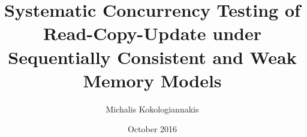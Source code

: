 \documentclass[diploma, english]{softlab-thesis}
\theoremstyle{definition}
\begin{document}

\frontmatter

\title{Systematic Concurrency Testing of Read-Copy-Update under Sequentially Consistent and Weak Memory Models}
\author{Michalis Kokologiannakis}
\date{October 2016}




\maketitle



\iffalse
\begin{abstractgr}%
  

  
\begin{keywordsgr}

\end{keywordsgr}
\end{abstractgr}
\fi


\begin{abstracten}%
  

  
\begin{keywordsen}

\end{keywordsen}
\end{abstracten}



\iffalse
\begin{acknowledgementsgr}
\end{acknowledgementsgr}
\fi
\end{document}
